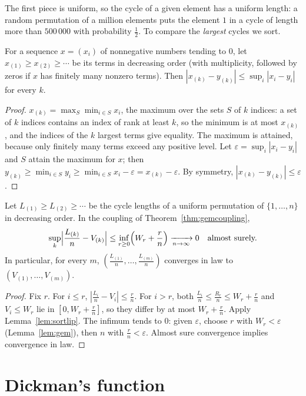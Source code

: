The first piece is uniform, so the cycle of a given element has a uniform length: a random permutation of a million elements puts the element $1$ in a cycle of length more than $500\,000$ with probability $\frac12$. To compare the \emph{largest} cycles we sort.

\begin{lemma}\label{lem:sortlip}
For a sequence $x=(x_i)$ of nonnegative numbers tending to $0$, let $x_{(1)}\ge x_{(2)}\ge\cdots$ be its terms in decreasing order (with multiplicity, followed by zeros if $x$ has finitely many nonzero terms). Then $|x_{(k)}-y_{(k)}|\le\sup_i|x_i-y_i|$ for every $k$.
\end{lemma}
\begin{proof}
$x_{(k)}=\max_S\min_{i\in S}x_i$, the maximum over the sets $S$ of $k$ indices: a set of $k$ indices contains an index of rank at least $k$, so the minimum is at most $x_{(k)}$, and the indices of the $k$ largest terms give equality. The maximum is attained, because only finitely many terms exceed any positive level. Let
$\varepsilon=\sup_i|x_i-y_i|$ and $S$ attain the maximum for $x$; then $y_{(k)}\ge\min_{i\in S}y_i\ge\min_{i\in S}x_i-\varepsilon=x_{(k)}-\varepsilon$. By symmetry, $|x_{(k)}-y_{(k)}|\le\varepsilon$.
\end{proof}

\begin{theorem}\label{thm:pdcycles}
Let $L_{(1)}\ge L_{(2)}\ge\cdots$ be the cycle lengths of a uniform permutation of $\{1,\dots,n\}$ in decreasing order. In the coupling of Theorem~\ref{thm:gemcoupling},
\[
\sup_k\Bigl|\frac{L_{(k)}}n-V_{(k)}\Bigr|\le\inf_{r\ge0}\Bigl(W_r+\frac rn\Bigr)\xrightarrow[n\to\infty]{}0\quad\text{almost surely.}
\]
In particular, for every $m$, $(\frac{L_{(1)}}n,\dots,\frac{L_{(m)}}n)$ converges in law to $(V_{(1)},\dots,V_{(m)})$.
\end{theorem}
\begin{proof}
Fix $r$. For $i\le r$, $|\frac{L_i}n-V_i|\le\frac rn$. For $i>r$, both $\frac{L_i}n\le\frac{R_r}n\le W_r+\frac rn$ and $V_i\le W_r$ lie in $[0,W_r+\frac rn]$, so they differ by at most $W_r+\frac rn$. Apply Lemma~\ref{lem:sortlip}. The infimum tends to $0$: given $\varepsilon$, choose $r$ with
$W_r<\varepsilon$ (Lemma~\ref{lem:gem}), then $n$ with $\frac rn<\varepsilon$. Almost sure convergence implies convergence in law.
\end{proof}

\section{Dickman's function}

